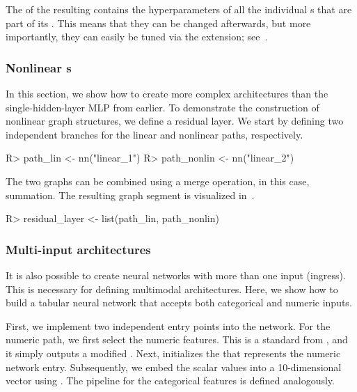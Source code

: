 \documentclass[article,shortnames]{jss}
\theoremstyle{definition}
\renewenvironment{CodeChunk}{\par\addvspace{0.6\baselineskip}\noindent\begin{minipage}{\linewidth}}{\end{minipage}\par\vspace{0.6\baselineskip}}
\begin{document}
The  of the resulting  contains the hyperparameters of all the individual s that are part of its .
This means that they can be changed afterwards, but more importantly, they can easily be tuned via the  extension; see~.

\subsubsection[Nonlinear Graphs]{Nonlinear s}\label{sec:complex-architectures}

In this section, we show how to create more complex architectures than the single-hidden-layer MLP from earlier.
To demonstrate the construction of nonlinear graph structures, we define a residual layer.
We start by defining two independent branches for the linear and nonlinear paths, respectively.

\begin{CodeChunk}
\begin{CodeInput}
R> path_lin <- nn("linear_1")
R> path_nonlin <- nn("linear_2") %
\end{CodeInput}
\end{CodeChunk}

The two graphs can be combined using a merge operation, in this case, summation.
The resulting graph segment is visualized in~.

\begin{CodeChunk}
\begin{CodeInput}
R> residual_layer <- list(path_lin, path_nonlin) %
\end{CodeInput}
\end{CodeChunk}

\subsubsection{Multi-input architectures}

It is also possible to create neural networks with more than one input (ingress).
This is necessary for defining multimodal architectures.
Here, we show how to build a tabular neural network that accepts both categorical and numeric inputs.

First, we implement two independent entry points into the network.
For the numeric path, we first select the numeric features.
This is a standard  from \mlrtpipelines{}, and it simply outputs a modified .
Next,  initializes the  that represents the numeric network entry.
Subsequently, we embed the scalar values into a 10-dimensional vector using  \citep{ref-gorishniy2021revisiting}.
The pipeline for the categorical features is defined analogously.
\end{document}
